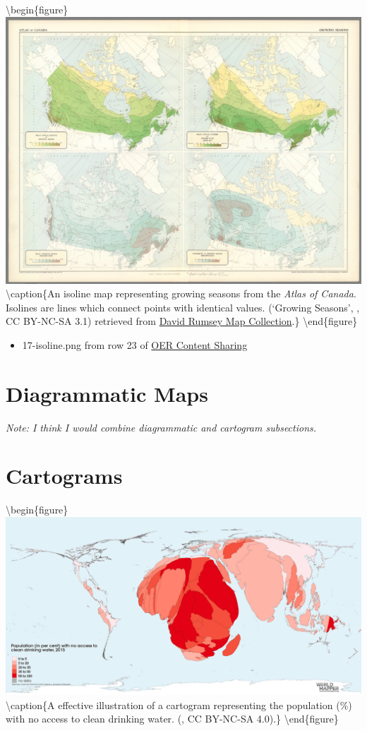 \documentclass[
]{book}
\providecommand{\tightlist}{%
  \setlength{\itemsep}{0pt}\setlength{\parskip}{0pt}}
\begin{document}
\textbackslash begin\{figure\}
\includegraphics[width=0.8\linewidth]{images/17-isoline} \textbackslash caption\{An isoline map representing growing seasons from the \emph{Atlas of Canada}. Isolines are lines which connect points with identical values. (`Growing Seasons', \citep{nicholson_growing_1950}, CC BY-NC-SA 3.1) retrieved from \href{https://www.davidrumsey.com/luna/servlet/s/c68r55}{David Rumsey Map Collection}.\}\label{fig:17-isoline}
\textbackslash end\{figure\}

\begin{itemize}
\tightlist
\item
  17-isoline.png from row 23 of \href{https://docs.google.com/spreadsheets/d/1LqzXn00wMeIjHWstNT3tMImNDZirLGc3g72jFOQc_8I/edit\#gid=817407192}{OER Content Sharing}
\end{itemize}

\hypertarget{diagrammatic-maps}{%
\section{Diagrammatic Maps}\label{diagrammatic-maps}}

\emph{Note: I think I would combine diagrammatic and cartogram subsections.}

\hypertarget{cartograms}{%
\section{Cartograms}\label{cartograms}}

\textbackslash begin\{figure\}
\includegraphics[width=0.8\linewidth]{images/17-cartogram} \textbackslash caption\{A effective illustration of a cartogram representing the population (\%) with no access to clean drinking water. (\citep{worldmapper_no_2015}, CC BY-NC-SA 4.0).\}\label{fig:17-cartogram}
\textbackslash end\{figure\}
\end{document}
